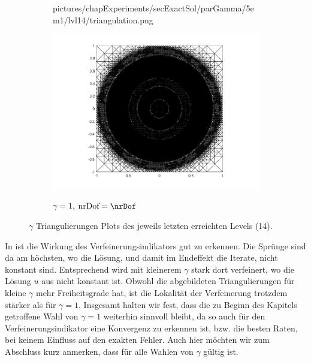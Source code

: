\begin{figure}[p]
\begin{subfigure}{.32\linewidth}
      {pictures/chapExperiments/secExactSol/parGamma/5em1/lvl14/triangulation.png}
    \label{fig:gammaDot5Triang}
  \end{subfigure}
  \begin{subfigure}{.32\linewidth}
    \centering
    \caption{$\gamma=1$, $\text{nrDof}=\nrDof$}
    \includegraphics[trim = 100 30 80 20, clip, width=\linewidth]
      {pictures/chapExperiments/secExactSol/parGamma/1/lvl14/triangulation.png}
    \label{fig:gamma1Triang}
  \end{subfigure}
  \caption{$\gamma$ Triangulierungen Plots des jeweils letzten erreichten 
  Levels (14).}
  \label{fig:gammaTriangs}
\end{figure}
In  ist die Wirkung des Verfeinerungsindikators gut zu
erkennen. 
Die Sprünge sind da am höchsten, wo die Lösung, und damit im Endeffekt die
Iterate, nicht konstant sind.   
Entsprechend wird mit kleinerem $\gamma$ stark dort verfeinert, wo die Lösung
$u$ aus  nicht konstant ist.
Obwohl die abgebildeten Triangulierungen für kleine $\gamma$ mehr 
Freiheitsgrade hat, ist die Lokalität der Verfeinerung trotzdem stärker
als für $\gamma=1$.
Insgesamt halten wir fest, dass die zu Beginn des Kapitels getroffene Wahl
von $\gamma=1$ weiterhin sinnvoll bleibt, da so auch für den
Verfeinerungsindikator eine Konvergenz zu erkennen ist, bzw. die besten
Raten, bei keinem Einfluss auf den exakten Fehler.
Auch hier möchten wir zum Abschluss kurz anmerken, dass
 für alle Wahlen von $\gamma$ gültig ist.

